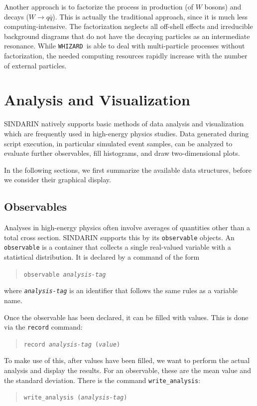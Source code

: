 \documentclass[12pt]{book}
\newcommand{\ttt}[1]{\texttt{#1}}
\newcommand{\whizard}{\texttt{WHIZARD}}
\begin{document}
Another approach is to factorize the process in production (of $W$ bosons) and
decays ($W\to q\bar q$).  This is actually the traditional approach, since it
is much less computing-intensive.  The factorization neglects all off-shell
effects and irreducible background diagrams that do not have the decaying
particles as an intermediate resonance.  While \whizard\ is able to deal with
multi-particle processes without factorization, the needed computing resources
rapidly increase with the number of external particles.



\section{Analysis and Visualization}
\label{sec:analysis}

SINDARIN natively supports basic methods of data analysis and visualization
which are frequently used in high-energy physics studies.  Data generated
during script execution, in particular simulated event samples, can be
analyzed to evaluate further observables, fill histograms, and draw
two-dimensional plots.

In the following sections, we first summarize the available data structures,
before we consider their graphical display.

\subsection{Observables}

Analyses in high-energy physics often involve averages of quantities other
than a total cross section.  SINDARIN supports this by its \ttt{observable}
objects.  An \ttt{observable} is a container that collects a single
real-valued variable with a statistical distribution.  It is declared by a
command of the form
\begin{quote}
  \begin{footnotesize}
\ttt{observable \emph{analysis-tag}}
  \end{footnotesize}
\end{quote}
where \ttt{\emph{analysis-tag}} is an identifier that follows the same rules
as a variable name.  

Once the observable has been declared, it can be filled with values.  This is
done via the \ttt{record} command:
\begin{quote}
  \begin{footnotesize}
\ttt{record \emph{analysis-tag} (\emph{value})}
  \end{footnotesize}
\end{quote}
To make use of this, after values have been filled, we want to perform the
actual analysis and display the results.  For an observable, these are the
mean value and the standard deviation.  There is the command
\ttt{write\_analysis}:
\begin{quote}
  \begin{footnotesize}
\ttt{write\_analysis (\emph{analysis-tag})}
  \end{footnotesize}
\end{quote}
\end{document}
